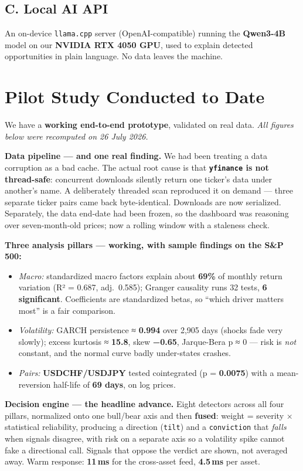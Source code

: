 \documentclass[11pt]{article}
\newcommand{\tk}[1]{\texttt{#1}}
\begin{document}
\subsection{C. Local AI API}
An on-device \tk{llama.cpp} server (OpenAI-compatible) running the \textbf{Qwen3-4B}
model on our \textbf{NVIDIA RTX 4050 GPU}, used to explain detected opportunities in
plain language. No data leaves the machine.

\section{Pilot Study Conducted to Date}
We have a \textbf{working end-to-end prototype}, validated on real data. \emph{All
figures below were recomputed on 26 July 2026.}

\begin{keybox}
\textbf{Data pipeline — and one real finding.} We had been treating a data corruption
as a bad cache. The actual root cause is that \textbf{\tk{yfinance} is not
thread-safe}: concurrent downloads silently return one ticker's data under another's
name. A deliberately threaded scan reproduced it on demand — three separate ticker
pairs came back byte-identical. Downloads are now serialized. Separately, the data
end-date had been frozen, so the dashboard was reasoning over seven-month-old prices;
now a rolling window with a staleness check.
\end{keybox}

\textbf{Three analysis pillars — working, with sample findings on the S\&P 500:}
\begin{itemize}
\item \emph{Macro:} standardized macro factors explain about \textbf{69\%} of monthly
return variation (R² = 0.687, adj.\ 0.585); Granger causality runs 32 tests,
\textbf{6 significant}. Coefficients are standardized betas, so ``which driver matters
most'' is a fair comparison.
\item \emph{Volatility:} GARCH persistence ≈ \textbf{0.994} over 2{,}905 days (shocks
fade very slowly); excess kurtosis ≈ \textbf{15.8}, skew \textbf{−0.65}, Jarque-Bera
p ≈ 0 — risk is \emph{not} constant, and the normal curve badly under-states crashes.
\item \emph{Pairs:} \textbf{USDCHF/USDJPY} tested cointegrated (p = \textbf{0.0075})
with a mean-reversion half-life of \textbf{69 days}, on log prices.
\end{itemize}

\textbf{Decision engine — the headline advance.} Eight detectors across all four
pillars, normalized onto one bull/bear axis and then \textbf{fused}: weight =
severity × statistical reliability, producing a direction (\tk{tilt}) and a
\tk{conviction} that \emph{falls} when signals disagree, with risk on a separate axis
so a volatility spike cannot fake a directional call. Signals that oppose the verdict
are shown, not averaged away. Warm response: \textbf{11\,ms} for the cross-asset feed,
\textbf{4.5\,ms} per asset.
\end{document}

